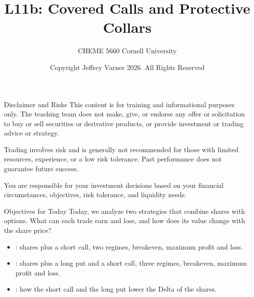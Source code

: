 \documentclass[aspectratio=169,11pt]{beamer}
\title{\texorpdfstring{{\vnheavy L11b}}{L11b}: Covered Calls and Protective Collars}
\subtitle{CHEME 5660 Cornell University}
\author{Copyright Jeffrey Varner 2026. All Rights Reserved}
\begin{document}
\vntitlepage

\begin{frame}{Disclaimer and Risks}
  \vspace{0.6em}
  \textbf{} This content is for training and informational
  purposes only. The teaching team does not make, give, or endorse any offer or
  solicitation to buy or sell securities or derivative products, or provide
  investment or trading advice or strategy.

  \vspace{1.1em}
  \textbf{} Trading involves risk and is generally not recommended for
  those with limited resources, experience, or a low risk tolerance. Past
  performance does not guarantee future success.

  \vspace{1.1em}
  \textbf{} You are responsible for your investment decisions
  based on your financial circumstances, objectives, risk tolerance, and
  liquidity needs.
\end{frame}

\begin{frame}{Objectives for Today}
  Today, we analyze two strategies that combine shares with options. What can
  each trade earn and lose, and how does its value change with the share price?

  \vspace{0.5em}
  {\large\textbf{}}
  \begin{itemize}\setlength{\itemsep}{0.4em}
    \item {}: shares plus a short call, two regimes,
      breakeven, maximum profit and loss.
    \item {}: shares plus a long put and a short call,
      three regimes, breakeven, maximum profit and loss.
    \item {}: how the short call and the long put lower the
      Delta of the shares.
  \end{itemize}
\end{frame}
\end{document}
